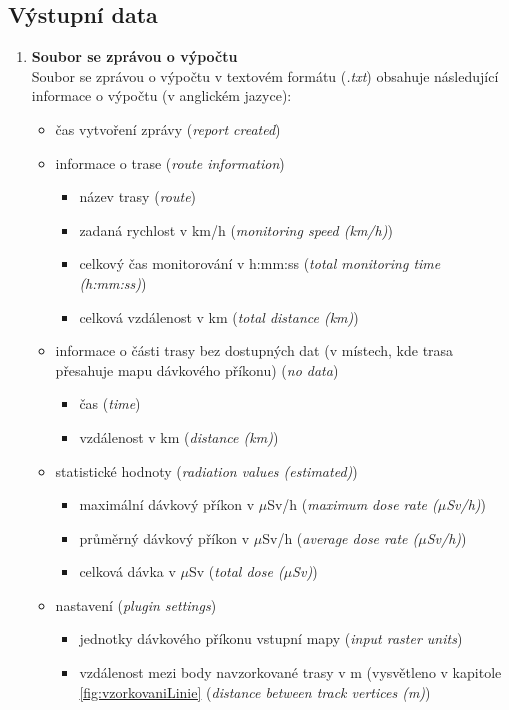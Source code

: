\subsection{Výstupní data}
\label{sec:VystupniData}
\begin{enumerate}
	\item \textbf{Soubor se zprávou o výpočtu} \\
	Soubor se zprávou o výpočtu v textovém formátu (\textit{.txt}) obsahuje následující informace o výpočtu (v anglickém jazyce):
		\begin{itemize}
			\item čas vytvoření zprávy (\textit{report created})
			
			\item informace o trase (\textit{route information})
			\begin{itemize}
				\item název trasy (\textit{route})
				\item zadaná rychlost v km/h (\textit{monitoring speed (km/h)})
				\item celkový čas monitorování v h:mm:ss (\textit{total monitoring time (h:mm:ss)})
				\item celková vzdálenost v km (\textit{total distance (km)})
			\end{itemize}
			
			\item informace o části trasy bez dostupných dat (v místech, kde trasa přesahuje mapu dávkového příkonu) (\textit{no data})
			\begin{itemize}
				\item čas (\textit{time})
				\item vzdálenost v km (\textit{distance (km)})
			\end{itemize}
			
			\item statistické hodnoty (\textit{radiation values (estimated)})
			\begin{itemize}
				\item maximální dávkový příkon v $\mu$Sv/h (\textit{maximum dose rate ($\mu$Sv/h)})
				\item průměrný dávkový příkon v $\mu$Sv/h (\textit{average dose rate ($\mu$Sv/h)})
				\item celková dávka v $\mu$Sv (\textit{total dose ($\mu$Sv)})
			\end{itemize}
			
			\item nastavení (\textit{plugin settings})
			\begin{itemize}
				\item jednotky dávkového příkonu vstupní mapy (\textit{input raster units})
				\item vzdálenost mezi body navzorkované trasy v m (vysvětleno v kapitole \ref{fig:vzorkovaniLinie} (\textit{distance between track vertices (m)})
			\end{itemize}
			

\end{itemize}
\end{enumerate}
